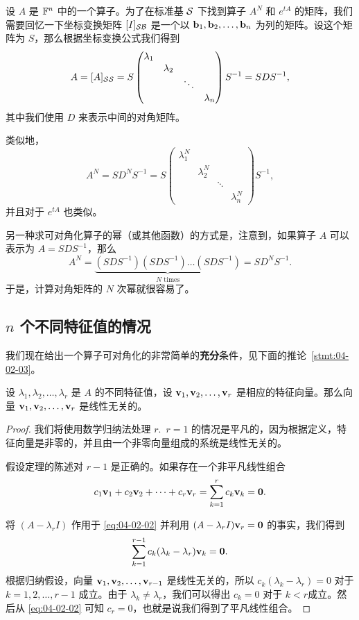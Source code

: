 设 $A$ 是 $\mathbb{F}^n$ 中的一个算子。为了在标准基 $\mathcal{S}$ 下找到算子 $A^N$ 和 $e^{tA}$ 的矩阵，我们需要回忆一下坐标变换矩阵 $[I]_{\mathcal{S}\mathcal{B}}$ 是一个以 $\mathbf{b}_1, \mathbf{b}_2, \dots, \mathbf{b}_n$ 为列的矩阵。设这个矩阵为 $S$，那么根据坐标变换公式我们得到
$$A = [A]_{\mathcal{S}\mathcal{S}} = S \begin{pmatrix} \lambda_1 & & & \\ & \lambda_2 & & \\ & & \ddots & \\ & & & \lambda_n \end{pmatrix} S^{-1} = SDS^{-1},$$
其中我们使用 $D$ 来表示中间的对角矩阵。

类似地，$$A^N = SD^N S^{-1} = S \begin{pmatrix} \lambda_1^N & & & \\ & \lambda_2^N & & \\ & & \ddots & \\ & & & \lambda_n^N \end{pmatrix} S^{-1},$$
并且对于 $e^{tA}$ 也类似。

另一种求可对角化算子的幂（或其他函数）的方式是，注意到，如果算子 $A$ 可以表示为 $A = SDS^{-1}$，那么
$$A^N = \underset{N \text{ times} }{\underbrace{(SDS^{-1})(SDS^{-1})\dots(SDS^{-1})} }= SD^N S^{-1}.$$
于是，计算对角矩阵的 $N$ 次幂就很容易了。

\subsection{\texorpdfstring{$n$ 个不同特征值的情况}{n 个不同特征值的情况}}\label{sec:04-02-03}

我们现在给出一个算子可对角化的非常简单的\textbf{充分}条件，见下面的推论~\ref{stmt:04-02-03}。

\begin{theorem}\label{stmt:04-02-02} 设 $\lambda_1, \lambda_2, \dots, \lambda_r$ 是 $A$ 的不同特征值，设 $\mathbf{v}_1, \mathbf{v}_2, \dots, \mathbf{v}_r$ 是相应的特征向量。那么向量 $\mathbf{v}_1, \mathbf{v}_2, \dots, \mathbf{v}_r$ 是线性无关的。\end{theorem}

\begin{proof}我们将使用数学归纳法处理 $r$.~$r=1$ 的情况是平凡的，因为根据定义，特征向量是非零的，并且由一个非零向量组成的系统是线性无关的。

假设定理的陈述对 $r-1$ 是正确的。如果存在一个非平凡线性组合
\begin{equation}\label{eq:04-02-02}
c_1 \mathbf{v}_1 + c_2 \mathbf{v}_2 + \dots + c_r \mathbf{v}_r = \sum_{k=1}^r c_k \mathbf{v}_k = \mathbf{0}.
\end{equation}

将 $(A - \lambda_r I)$ 作用于 \eqref{eq:04-02-02} 并利用 $(A - \lambda_r I)\mathbf{v}_r = \mathbf{0}$ 的事实，我们得到
$$\sum_{k=1}^{r-1} c_k (\lambda_k - \lambda_r) \mathbf{v}_k = \mathbf{0}.$$
根据归纳假设，向量 $\mathbf{v}_1, \mathbf{v}_2, \dots, \mathbf{v}_{r-1}$ 是线性无关的，所以 $c_k(\lambda_k - \lambda_r) = 0$ 对于 $k=1, 2, \dots, r-1$ 成立。由于 $\lambda_k \neq \lambda_r$，我们可以得出 $c_k = 0$ 对于 $k < r$成立。然后从 \eqref{eq:04-02-02} 可知 $c_r = 0$，也就是说我们得到了平凡线性组合。\end{proof}

